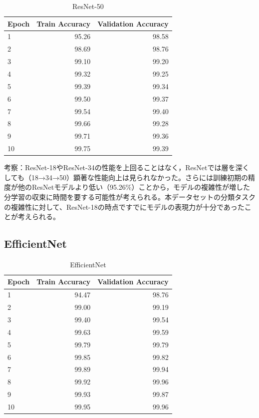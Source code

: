 \documentclass[a4paper,11pt,titlepage]{jsarticle}
\begin{document}
\begin{table}[H]
\centering
\caption{ResNet-50}
\label{tab:ResNet50}
\begin{tabular}{lrr}
\hline
 Epoch &  Train Accuracy &  Validation Accuracy \\
\hline
     1 &           95.26 &                98.58 \\
     2 &           98.69 &                98.76 \\
     3 &           99.10 &                99.20 \\
     4 &           99.32 &                99.25 \\
     5 &           99.39 &                99.34 \\
     6 &           99.50 &                99.37 \\
     7 &           99.54 &                99.40 \\
     8 &           99.66 &                99.28 \\
     9 &           99.71 &                99.36 \\
    10 &           99.75 &                99.39 \\
\hline
\end{tabular}
\end{table}

考察：ResNet-18やResNet-34の性能を上回ることはなく，ResNetでは層を深くしても（18→34→50）顕著な性能向上は見られなかった。さらには訓練初期の精度が他のResNetモデルより低い（95.26\%）ことから，モデルの複雑性が増した分学習の収束に時間を要する可能性が考えられる。本データセットの分類タスクの複雑性に対して、ResNet-18の時点ですでにモデルの表現力が十分であったことが考えられる。


\subsection{EfficientNet}

\begin{table}[H]
\centering
\caption{EfficientNet}
\label{tab:efficientnet}
\begin{tabular}{lrr}
\hline
 Epoch &  Train Accuracy &  Validation Accuracy \\
\hline
     1 &           94.47 &                98.76 \\
     2 &           99.00 &                99.19 \\
     3 &           99.40 &                99.54 \\
     4 &           99.63 &                99.59 \\
     5 &           99.79 &                99.79 \\
     6 &           99.85 &                99.82 \\
     7 &           99.89 &                99.94 \\
     8 &           99.92 &                99.96 \\
     9 &           99.93 &                99.87 \\
    10 &           99.95 &                99.96 \\
\hline
\end{tabular}
\end{table}
\end{document}
